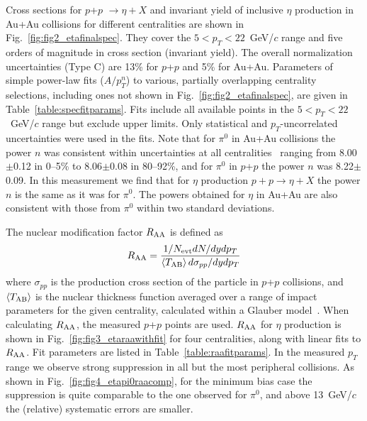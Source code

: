 \documentclass[aps,prc,superscriptaddress,showpacs,nofootinbib,floatfix,twocolumn]{revtex4}
\def\pt{$p_T$}
\def\pts{$p_T$ }
\def\gevcs{~GeV/$c$ }
\def\raa{$R_{\rm AA}$}
\def\raas{$R_{\rm AA}$ }
\def\pp{$p$+$p$ }
\def\piz{$\pi^{0}$}
\def\pizs{$\pi^{0}$ }
\def\hs{$\eta$ }
\def\mean#1{\left<#1\right>}
\begin{document}


Cross sections for \pp$\rightarrow\eta+X$ and invariant yield of 
inclusive \hs production in Au+Au collisions for different 
centralities are shown in Fig.~\ref{fig:fig2_etafinalspec}.  They 
cover the $5<p_T<22$\gevcs range and five orders of magnitude in cross 
section (invariant yield).  The overall normalization uncertainties 
(Type C) are 13\% for \pp and 5\% for Au+Au.  Parameters of simple 
power-law fits ($A/p_T^n$) to various, partially overlapping 
centrality selections, including ones not shown in 
Fig.~\ref{fig:fig2_etafinalspec}, are given in 
Table~\ref{table:specfitparams}.  Fits include all available points in 
the $5<$\pt$<22$\gevcs range but exclude upper limits.  Only 
statistical and \pt-uncorrelated uncertainties were used in the fits.  
Note that for \pizs in Au+Au collisions the power $n$ was consistent 
within uncertainties at all centralities~\cite{ppg080} ranging from 
8.00$\pm$0.12 in 0--5\% to 8.06$\pm$0.08 in 80--92\%, and for \pizs in 
\pp the power $n$ was 8.22$\pm$0.09.  In this measurement we find that 
for \hs production $p+p\rightarrow\eta+X$ the power $n$ is the same as 
it was for \piz.  The powers obtained for \hs in Au+Au are also 
consistent with those from \pizs within two standard deviations.


The nuclear modification factor \raas is defined as \[R_{\rm AA} = 
\frac{1/{N_{\rm evt}} dN/dydp_T}{\mean{T_{\rm AB}}d\sigma_{pp}/dydp_T} 
\] where $\sigma_{pp}$ is the production cross section of the particle 
in \pp collisions, and $\mean{T_{\rm AB}}$ is the nuclear thickness 
function averaged over a range of impact parameters for the given 
centrality, calculated within a Glauber model~\cite{Miller2007}.  When 
calculating \raa, the measured \pp points are used.  \raas for \hs 
production is shown in Fig.~\ref{fig:fig3_etaraawithfit} for four 
centralities, along with linear fits to \raa.  Fit parameters are 
listed in Table~\ref{table:raafitparams}.  In the measured \pts range 
we observe strong suppression in all but the most peripheral 
collisions.  As shown in Fig.~\ref{fig:fig4_etapi0raacomp}, for the 
minimum bias case the suppression is quite comparable to the one 
observed for \piz, and above 13\gevcs the (relative) systematic errors 
are smaller.
\end{document}
